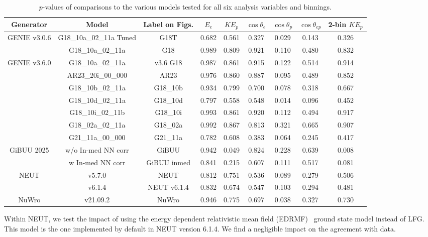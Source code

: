 \documentclass[amsmath,amssymb,aps,prd,showpacs,twocolumn,superscriptaddress,letterpaper,longbibliography, floatfix]{revtex4-2}
\begin{document}
\begin{table}[t]
\caption{$p$-values of comparisons to the various models tested for all six analysis variables and binnings.}
\label{tbl:pvalues}
{\begin{center} \begin{tabular}{|c|c|c|c|c|c|c|c|c|}
\hline
Generator & Model& Label on Figs. & $E_e$ &$KE_p$ & $\cos{\theta_{e}}$ & $\cos{\theta_{p}}$&$\cos{\theta_{ep}}$ & 2-bin $KE_p$ \\
\hline
\hline
\multirow{2}{*}{GENIE v3.0.6 } &G18\_10a\_02\_11a Tuned & G18T &0.682& 0.561& 0.327& 0.029&  0.143& 0.326\\
\cline{2-9}
& G18\_10a\_02\_11a & G18&0.989& 0.809& 0.921& 0.110& 0.480& 0.832\\
\hline
\hline
\multirow{6}{*}{GENIE v3.6.0 }& G18\_10a\_02\_11a& v3.6 G18& 0.987  & 0.861 & 0.915& 0.122 &0.514 & 0.914 \\
\cline{2-9}
&AR23\_20i\_00\_000&AR23 & 0.976 & 0.860 & 0.887& 0.095& 0.489& 0.852\\
\cline{2-9}
&G18\_10b\_02\_11a& G18\_10b&  0.934 & 0.799& 0.700 &  0.078& 0.318& 0.667\\
\cline{2-9}
&G18\_10d\_02\_11a&G18\_10d & 0.797& 0.558& 0.548& 0.014& 0.096& 0.452\\
\cline{2-9}
&G18\_10i\_02\_11b&G18\_10i &  0.993& 0.861& 0.920& 0.112& 0.494& 0.917\\
\cline{2-9}
&G18\_02a\_02\_11a& G18\_02a&  0.992& 0.867& 0.813& 0.321& 0.665& 0.907\\
\cline{2-9}
&G21\_11a\_00\_000 &G21\_11a & 0.782& 0.608& 0.383& 0.064& 0.245& 0.417\\
\hline
\hline
\multirow{2}{*}{GiBUU 2025} & w/o In-med NN corr& GiBUU&0.942 & 0.049 &0.824 &0.228 & 0.639 &0.008 \\
\cline{2-9}
& w In-med NN corr & 
GiBUU inmed  &0.841& 0.215& 0.607& 0.111& 0.517& 0.081\\
\hline
\hline
\multirow{2}{*}{NEUT } &v5.7.0&NEUT &  0.812& 0.751& 0.536& 0.089& 0.279& 0.506\\
\cline{2-9}
& v6.1.4 & NEUT v6.1.4 & 0.832&0.674 &0.547 &0.103 &0.294 &0.481 \\
\hline
\hline
NuWro & v21.09.2&NuWro &0.946& 0.775& 0.697& 0.038& 0.327& 0.730\\
\hline
\end{tabular} \end{center}}
\end{table}

Within NEUT, we test the impact of using the energy dependent relativistic mean field (EDRMF)~\cite{NEUTEDRMF,EDRMF} ground state model instead of LFG. This model is the one implemented by default in NEUT version 6.1.4. We find a negligible impact on the agreement with data. \\
\end{document}

